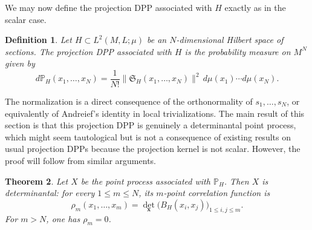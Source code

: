 \documentclass[12pt,a4paper,reqno]{article}
\theoremstyle{thmstyleone}
\newtheorem{theorem}{Theorem}[subsection]
\theoremstyle{thmstylethree}
\newtheorem{definition}[theorem]{Definition}
\theoremstyle{thmstyletwo}
\numberwithin{equation}{subsection}
\def\leq{\leqslant}
\begin{document}

We may now define the projection DPP associated with $H$ exactly as in the scalar case.

\begin{definition}\label{def:section-projection-DPP}
Let $H\subset L^2(M,L;\mu)$ be an $N$-dimensional Hilbert space of sections. The projection DPP associated with $H$ is the probability measure on $M^N$ given by
\[
    d\mathbb P_H(x_1,\ldots,x_N)
    =
    \frac{1}{N!}
    \|\mathfrak S_H(x_1,\ldots,x_N)\|^2
    \,d\mu(x_1)\cdots d\mu(x_N).
\]
\end{definition}

The normalization is a direct consequence of the orthonormality of $s_1,\ldots,s_N$, or equivalently of Andreief's identity in local trivializations. The main result of this section is that this projection DPP is genuinely a determinantal point process, which might seem tautological but is not a consequence of existing results on usual projection DPPs because the projection kernel is not scalar. However, the proof will follow from similar arguments.

\begin{theorem}\label{thm:intrinsic-determinantal-property}
Let $X$ be the point process associated with $\mathbb P_H$. Then $X$ is determinantal: for every $1\leq m\leq N$, its $m$-point correlation function is
\[
    \rho_m(x_1,\ldots,x_m)
    =
    \det_{\mathbf x}
    \big(B_H(x_i,x_j)\big)_{1\leq i,j\leq m}.
\]
For $m>N$, one has $\rho_m=0$.
\end{theorem}
\end{document}
